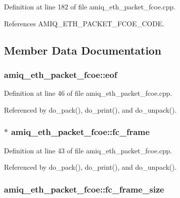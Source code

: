 Definition at line 182 of file amiq\_\-eth\_\-packet\_\-fcoe.cpp.

References AMIQ\_\-ETH\_\-PACKET\_\-FCOE\_\-CODE.

\subsection{Member Data Documentation}
\hypertarget{classamiq__eth__packet__fcoe_a36a4571a088c2cfb6fdf850926bee2eb}{
\subsubsection[{eof}]{ {\bf amiq\_\-eth\_\-packet\_\-fcoe::eof}}}
\label{classamiq__eth__packet__fcoe_a36a4571a088c2cfb6fdf850926bee2eb}


Definition at line 46 of file amiq\_\-eth\_\-packet\_\-fcoe.cpp.

Referenced by do\_\-pack(), do\_\-print(), and do\_\-unpack().\hypertarget{classamiq__eth__packet__fcoe_a64d80e48f4ede107bb86908f9f1b8b1b}{
\subsubsection[{fc\_\-frame}]{$\ast$ {\bf amiq\_\-eth\_\-packet\_\-fcoe::fc\_\-frame}}}
\label{classamiq__eth__packet__fcoe_a64d80e48f4ede107bb86908f9f1b8b1b}


Definition at line 43 of file amiq\_\-eth\_\-packet\_\-fcoe.cpp.

Referenced by do\_\-pack(), do\_\-print(), and do\_\-unpack().\hypertarget{classamiq__eth__packet__fcoe_a3bff6efa35437af20ee1bc17af91ec45}{
\subsubsection[{fc\_\-frame\_\-size}]{ {\bf amiq\_\-eth\_\-packet\_\-fcoe::fc\_\-frame\_\-size}}}
\label{classamiq__eth__packet__fcoe_a3bff6efa35437af20ee1bc17af91ec45}


